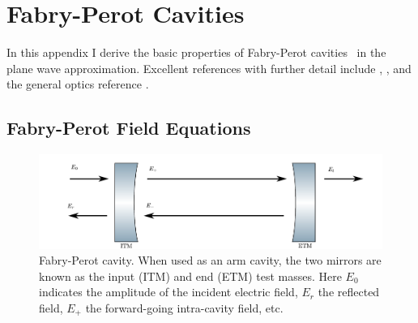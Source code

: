 \chapter{Fabry-Perot Cavities}
\label{sec:cavities}
In this appendix I derive the basic properties of Fabry-Perot
cavities~\cite{Fabry1892Theorie,Fabry1901New} in the plane wave approximation.
Excellent references with further detail include \cite{Siegman1990Lasers}, \cite{Fox1961Resonant},
and the general optics reference \cite{Haus1983Waves}.

\section{Fabry-Perot Field Equations}

\begin{figure}
\includegraphics[]{figures/cavity.pdf}
\caption[Fabry-Perot Cavity]{\label{fig:fabry-perot}Fabry-Perot
  cavity.  When used as an arm cavity, the two mirrors are known as
  the input (ITM) and end (ETM) test masses.  Here $E_0$ indicates the
  amplitude of the incident electric field, $E_r$ the reflected field,
  $E_+$ the forward-going intra-cavity field, etc.}
\end{figure}


